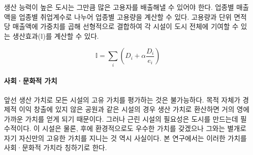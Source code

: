 \documentclass[10pt]{article}
\begin{document}
\begin{multicols}{2}
생산 능력이 높은 도시는 그만큼 많은 고용자를 배출해낼 수 있어야 한다. 업종별 매출액을 업종별 취업계수로 나누어 업종별 고용량을 계산할 수 있다. 고용량과 단위 면적당 매출액에 가중치를 곱해 선형적으로 결합하여 각 시설이 도시 전체에 기여할 수 있는 생산효과($\mathbb{I}$)를 계산할 수 있다.


\begin{equation}
    \mathbb{I} = \sum_i (D_{i}+\alpha\frac{D_i}{e_i})
\end{equation}


\paragraph{사회\!·\!문화적 가치}
앞선 생산 가치로 모든 시설의 고유 가치를 평가하는 것은 불가능하다. 목적 자체가 경제적 이익 창출에 있지 않은 공원과 같은 시설의 경우 생산 가치로 환산하면 거의 영에 가까운 가치를 얻게 되기 때문이다. 그러나 근린 시설의 필요성은 도시를 만드는데 필수적이다. 이 시설은 물론, 후에 환경적으로도 우수한 가치를 갖겠으나 그와는 별개로 자기 자신만의 고유한 가치를 지니는 것 역시 사실이다. 본 연구에서는 이러한 가치를 사회·문화적 가치라 칭하기로 한다.


\end{multicols}
\end{document}
